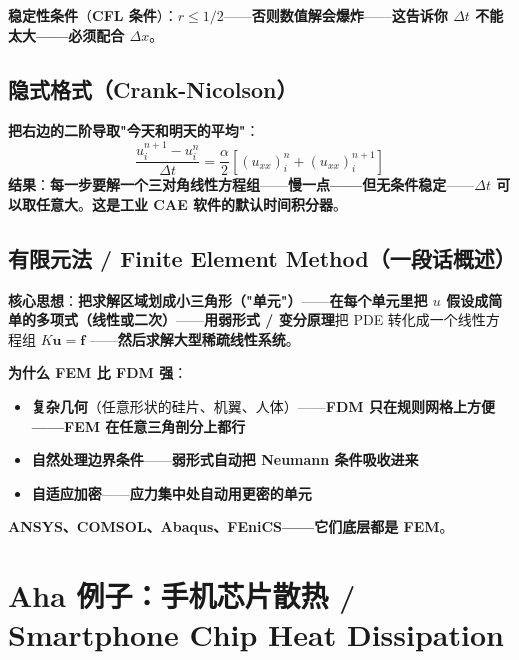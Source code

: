 \textbf{稳定性条件}（\textbf{CFL 条件}）：\textbf{$r \le 1/2$}——\textbf{否则数值解会爆炸}——\textbf{这告诉你 $\Delta t$ 不能太大——必须配合 $\Delta x$}。

\subsection{隐式格式（Crank-Nicolson）}

\textbf{把右边的二阶导取"今天和明天的平均"}：
\[
\frac{u^{n+1}_i - u^n_i}{\Delta t} = \frac{\alpha}{2}\left[ (u_{xx})^n_i + (u_{xx})^{n+1}_i \right]
\]
\textbf{结果}：\textbf{每一步要解一个三对角线性方程组}——\textbf{慢一点——但\textbf{无条件稳定}}——\textbf{$\Delta t$ 可以取任意大}。\textbf{这是工业 CAE 软件的默认时间积分器}。

\subsection{有限元法 / Finite Element Method（一段话概述）}

\textbf{核心思想}：\textbf{把求解区域划成小三角形（"单元"）}——\textbf{在每个单元里把 $u$ 假设成简单的多项式（线性或二次）}——\textbf{用\textbf{弱形式 / 变分原理}}把 PDE 转化成一个线性方程组 $K \bm{u} = \bm{f}$ ——\textbf{然后求解大型稀疏线性系统}。

\textbf{为什么 FEM 比 FDM 强}：

\begin{itemize}
\item \textbf{复杂几何}（任意形状的硅片、机翼、人体）——\textbf{FDM 只在规则网格上方便——FEM 在任意三角剖分上都行}
\item \textbf{自然处理边界条件}——\textbf{弱形式自动把 Neumann 条件吸收进来}
\item \textbf{自适应加密}——\textbf{应力集中处自动用更密的单元}
\end{itemize}

\textbf{ANSYS、COMSOL、Abaqus、FEniCS——它们底层都是 FEM}。

\section{Aha 例子：手机芯片散热 / Smartphone Chip Heat Dissipation}

